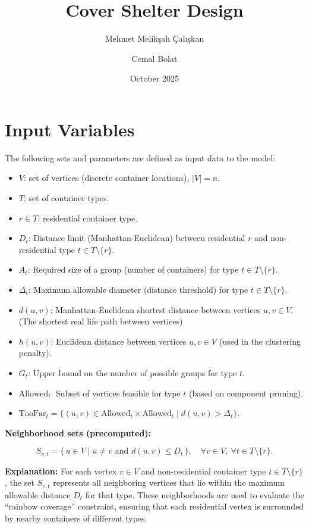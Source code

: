 \documentclass[12pt,a4paper]{article}
\title{Cover Shelter Design}
\author{Mehmet Melikşah Çalışkan \and Cemal Bolat}
\date{October 2025}
\begin{document}
\maketitle

\section{Input Variables}

The following sets and parameters are defined as input data to the model:

\begin{itemize}
    \item $V$: set of vertices (discrete container locations), $|V|=n$.
    \item $T$: set of container types.
    \item $r \in T$: residential container type.
    \item $D_t$: Distance limit (Manhattan-Euclidean) between residential $r$ and non-residential type $t \in T \setminus\{r\}$.
    \item $A_t$: Required size of a group (number of containers) for type $t \in T \setminus \{r\}$.
    \item $\Delta_t$: Maximum allowable diameter (distance threshold) for type $t \in T \setminus \{r\}$.
    \item $d(u,v)$: Manhattan-Euclidean shortest distance between vertices $u,v \in V$. (The shortest real life path between vertices) 
    \item $h(u,v)$: Euclidean distance between vertices $u,v\in V$ (used in the clustering penalty).
    \item $G_t$: Upper bound on the number of possible groups for type $t$.
    \item $\text{Allowed}_t$: Subset of vertices feasible for type $t$ (based on component pruning).
    \item $\text{TooFar}_t = \{(u,v) \in \text{Allowed}_t \times \text{Allowed}_t \mid d(u,v) > \Delta_t\}$.
\end{itemize}


\vspace{1em}
\textbf{Neighborhood sets (precomputed):}

\[
S_{v,t} = \{\, u \in V \mid u \neq v \text{ and } d(u,v) \le D_t \,\},
\quad \forall v\in V,\ \forall t\in T\setminus\{r\}.
\]

\textbf{Explanation:}
For each vertex $v \in V$ and non-residential container type $t \in T \setminus \{r\}$,
the set $S_{v,t}$ represents all neighboring vertices that lie within the
maximum allowable distance $D_t$ for that type.
These neighborhoods are used to evaluate the ``rainbow coverage'' constraint,
ensuring that each residential vertex is surrounded by nearby containers of different types.
\end{document}
